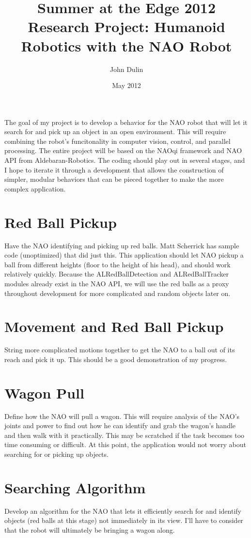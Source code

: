 \documentclass{article}
\author{John Dulin}
\date{May 2012}
\title{Summer at the Edge 2012 Research Project: Humanoid Robotics with the NAO Robot}
\begin{document}
\maketitle

The goal of my project is to develop a behavior for the NAO robot that will let it search for and pick up an object in
an open environment.  This will require combining the robot's funcitonality in computer vision, control, and parallel
processing.  The entire project will be based on the NAOqi framework and NAO API from Aldebaran-Robotics.
The coding should play out in several stages, and I hope to iterate it through a development that allows the
construction of simpler, modular behaviors that can be pieced together to make the more complex application.

\section{Red Ball Pickup}
Have the NAO identifying and picking up red balls.  Matt Scherrick has sample code (unoptimized) that did just this.  This application should let NAO pickup a ball from different heights (floor to the height of his head), and should work relatively quickly.  Because the ALRedBallDetection and ALRedBallTracker modules already exist in the NAO API, we will use the red balls as a proxy throughout development for more complicated and random objects later on.

\section{Movement and Red Ball Pickup}
String more complicated motions together to get the NAO to a ball out of its reach and pick it up.  This should be a good demonstration of my progress.

\section{Wagon Pull}
Define how the NAO will pull a wagon.  This will require analysis of the NAO's joints and power to find out how he can identify and grab the wagon's handle and then walk with it practically.  This may be scratched if the task becomes too time consuming or difficult.  At this point, the application would not worry about searching for or picking up objects.

\section{Searching Algorithm}
Develop an algorithm for the NAO that lets it efficiently search for and identify objects (red balls at this stage) not immediately in its view.  I'll have to consider that the robot will ultimately be
bringing a wagon along.   
\end{document}
